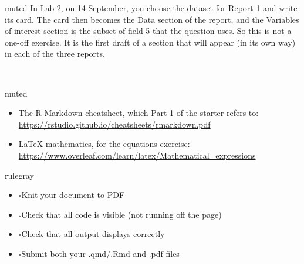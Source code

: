 \documentclass[11pt,letterpaper]{article}
\newcommand{\checkbox}{\(\square\)}
\begin{document}
\begin{callout}[title={\sffamily\fontsize{7.5}{9}\selectfont\color{muted}NOTE --- WHAT HAPPENS TO THE CARD}]{muted}
In Lab 2, on 14 September, you choose the dataset for Report 1 and write its card. The card then becomes the Data section of the report, and the Variables of interest section is the subset of field 5 that the question uses. So this is not a one-off exercise. It is the first draft of a section that will appear (in its own way) in each of the three reports.
\end{callout}
~\\

\begin{callout}[title={\sffamily\fontsize{7.5}{9}\selectfont\color{muted}READING --- REFERENCE}]{muted}
\begin{itemize}[leftmargin=16pt,itemsep=3pt]
  \item The R Markdown cheatsheet, which Part 1 of the starter refers to: \url{https://rstudio.github.io/cheatsheets/rmarkdown.pdf}
  \item LaTeX mathematics, for the equations exercise: \url{https://www.overleaf.com/learn/latex/Mathematical_expressions}
\end{itemize}
\end{callout}

\vspace{16pt}
\begin{callout}[title={\sffamily\fontsize{7.5}{9}\selectfont\color{rulegray}SUBMISSION}]{rulegray}
\begin{itemize}[leftmargin=16pt,itemsep=6pt]
  \item \checkbox\quad Knit your document to PDF
  \item \checkbox\quad Check that all code is visible (not running off the page)
  \item \checkbox\quad Check that all output displays correctly
  \item \checkbox\quad Submit both your .qmd/.Rmd and .pdf files
\end{itemize}
\end{callout}
\end{document}
